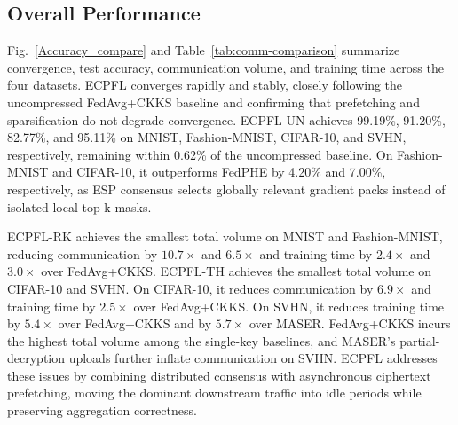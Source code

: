 \subsection{Overall Performance}
\label{subsec:accuracy}

Fig.~\ref{Accuracy_compare} and Table~\ref{tab:comm-comparison} summarize convergence, test accuracy, communication volume, and training time across the four datasets.
ECPFL converges rapidly and stably, closely following the uncompressed FedAvg+CKKS baseline and confirming that prefetching and sparsification do not degrade convergence.
ECPFL-UN achieves 99.19\%, 91.20\%, 82.77\%, and 95.11\% on MNIST, Fashion-MNIST, CIFAR-10, and SVHN, respectively, remaining within 0.62\% of the uncompressed baseline.
On Fashion-MNIST and CIFAR-10, it outperforms FedPHE by 4.20\% and 7.00\%, respectively, as ESP consensus selects globally relevant gradient packs instead of isolated local top-k masks.

ECPFL-RK achieves the smallest total volume on MNIST and Fashion-MNIST, reducing communication by $10.7\times$ and $6.5\times$ and training time by $2.4\times$ and $3.0\times$ over FedAvg+CKKS.
ECPFL-TH achieves the smallest total volume on CIFAR-10 and SVHN.
On CIFAR-10, it reduces communication by $6.9\times$ and training time by $2.5\times$ over FedAvg+CKKS.
On SVHN, it reduces training time by $5.4\times$ over FedAvg+CKKS and by $5.7\times$ over MASER.
FedAvg+CKKS incurs the highest total volume among the single-key baselines, and MASER's partial-decryption uploads further inflate communication on SVHN.
ECPFL addresses these issues by combining distributed consensus with asynchronous ciphertext prefetching, moving the dominant downstream traffic into idle periods while preserving aggregation correctness.
